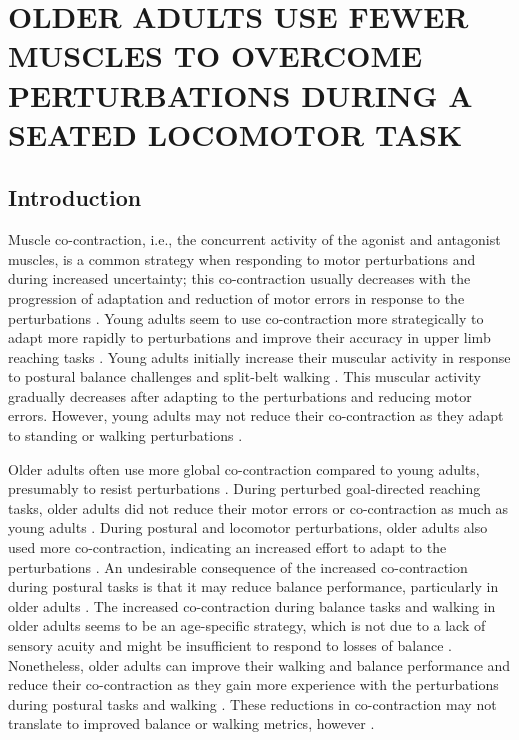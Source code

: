 \documentclass[../thesis_seyed.tex]{subfiles}
\begin{document}
\chapter{OLDER ADULTS USE FEWER MUSCLES TO OVERCOME PERTURBATIONS DURING A SEATED LOCOMOTOR TASK}
\section{Introduction}

Muscle co-contraction, i.e., the concurrent activity of the agonist and antagonist muscles, is a common strategy when responding to motor perturbations and during increased uncertainty; this co-contraction usually decreases with the progression of adaptation and reduction of motor errors in response to the perturbations \cite{Thoroughman1999-pz,Huang2012-dr}. Young adults seem to use co-contraction more strategically to adapt more rapidly to perturbations and improve their accuracy in upper limb reaching tasks \cite{Gribble2003-tj,Heald2018-ko}. Young adults initially increase their muscular activity in response to postural balance challenges and split-belt walking \cite{Finley2013-lu,Kim2018-jj}. This muscular activity gradually decreases after adapting to the perturbations and reducing motor errors. However, young adults may not reduce their co-contraction as they adapt to standing or walking perturbations \cite{Kim2018-jj,Acuna2019-lo}.

Older adults often use more global co-contraction compared to young adults, presumably to resist perturbations \cite{Huang2014-nh,Iwamoto2017-ji,Thompson2018-ku}. During perturbed goal-directed reaching tasks, older adults did not reduce their motor errors or co-contraction as much as young adults \cite{Huang2014-nh,Wittenberg2020-bz}. During postural and locomotor perturbations, older adults also used more co-contraction, indicating an increased effort to adapt to the perturbations \cite{Iwamoto2017-ji,Acuna2019-lo}. An undesirable consequence of the increased co-contraction during postural tasks is that it may reduce balance performance, particularly in older adults \cite{Nagai2017-ul}. The increased co-contraction during balance tasks and walking in older adults seems to be an age-specific strategy, which is not due to a lack of sensory acuity and might be insufficient to respond to losses of balance \cite{Tang1998-jp,Craig2016-wh,Nagai2017-ul,Thompson2018-ku,Le_Mouel2019-wf}. Nonetheless, older adults can improve their walking and balance performance and reduce their co-contraction as they gain more experience with the perturbations during postural tasks and walking \cite{Nagai2012-kp,Richards2019-tz}. These reductions in co-contraction may not translate to improved balance or walking metrics, however \cite{Nagai2011-on,Parijat2015-ru,Alizadehsaravi2020-wh}.
\end{document}

